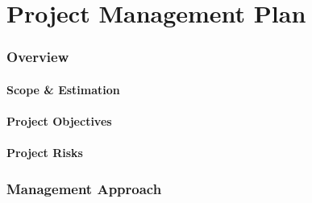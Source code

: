 \documentclass[12pt,a4paper]{article}
\begin{document}


\clearpage
{}
\setcounter{page}{1}







\clearpage
{}
\setcounter{page}{1}

\part{Project Management Plan}

\section{Overview}
    \subsection{Scope \& Estimation}
    

    \subsection{Project Objectives}
    

    \subsection{Project Risks}
    

\section{Management Approach}
    
\end{document}

